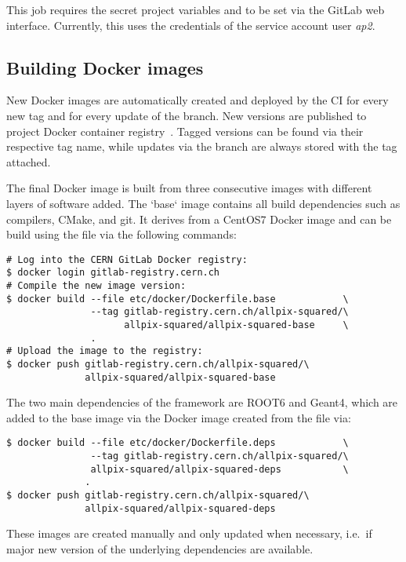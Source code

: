 This job requires the secret project variables  and  to be set via the GitLab web interface.
Currently, this uses the credentials of the service account user \emph{ap2}.

\subsection{Building Docker images}
\label{sec:build-docker}

New \apsq Docker images are automatically created and deployed by the CI for every new tag and for every update of the  branch.
New versions are published to project Docker container registry~\cite{ap2-container-registry}.
Tagged versions can be found via their respective tag name, while updates via the branch are always stored with the  tag attached.

The final Docker image is built from three consecutive images with different layers of software added.
The `base` image contains all build dependencies such as compilers, CMake, and git.
It derives from a CentOS7 Docker image and can be build using the  file via the following commands:

\begin{verbatim}
# Log into the CERN GitLab Docker registry:
$ docker login gitlab-registry.cern.ch
# Compile the new image version:
$ docker build --file etc/docker/Dockerfile.base            \
               --tag gitlab-registry.cern.ch/allpix-squared/\
                     allpix-squared/allpix-squared-base     \
               .
# Upload the image to the registry:
$ docker push gitlab-registry.cern.ch/allpix-squared/\
              allpix-squared/allpix-squared-base
\end{verbatim}

The two main dependencies of the framework are ROOT6 and Geant4, which are added to the base image via the  Docker image created from the file  via:
\begin{verbatim}
$ docker build --file etc/docker/Dockerfile.deps            \
               --tag gitlab-registry.cern.ch/allpix-squared/\
               allpix-squared/allpix-squared-deps           \
              .
$ docker push gitlab-registry.cern.ch/allpix-squared/\
              allpix-squared/allpix-squared-deps
\end{verbatim}
These images are created manually and only updated when necessary, i.e.\ if major new version of the underlying dependencies are available.

